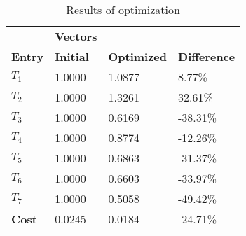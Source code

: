 \begin{table}[H]
\centering
\begin{tabular}{llll}
\textbf{}      & \cellcolor[HTML]{EFEFEF}\textbf{Vectors} & \textbf{} & \textbf{}         \\
\rowcolor[HTML]{EFEFEF} 
\textbf{Entry} & \textbf{Initial} & \textbf{Optimized} & \textbf{Difference} \\
$T_1$ & 1.0000 & 1.0877 & 8.77\% \\ 
$T_2$ & 1.0000 & 1.3261 & 32.61\% \\ 
$T_3$ & 1.0000 & 0.6169 & -38.31\% \\ 
$T_4$ & 1.0000 & 0.8774 & -12.26\% \\ 
$T_5$ & 1.0000 & 0.6863 & -31.37\% \\ 
$T_6$ & 1.0000 & 0.6603 & -33.97\% \\ 
$T_7$ & 1.0000 & 0.5058 & -49.42\% \\ 
\rowcolor[HTML]{EFEFEF} 
\textbf{Cost}  & 0.0245 & 0.0184 & -24.71\% \\ 
\end{tabular}
\caption{Results of optimization}
\label{tab:OptimizationAnalysis}
\end{table}